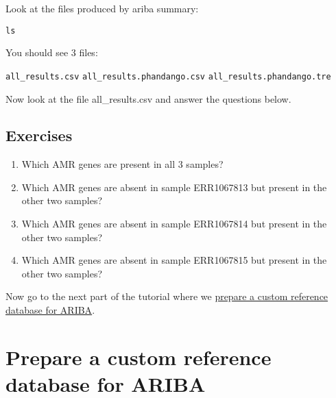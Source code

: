 \documentclass[11pt]{article}
\makeatletter
\providecommand{\tightlist}{%
      \setlength{\itemsep}{0pt}\setlength{\parskip}{0pt}}
\newcommand{\boxspacing}{\kern\kvtcb@left@rule\kern\kvtcb@boxsep}
\newcommand{\prompt}[4]{
        {\ttfamily\llap{{\color{blue}\LARGE\faKeyboardO\hspace{3pt}#4}}\vspace{-\baselineskip}}
    }
\makeatother
\begin{document}
    Look at the files produced by ariba summary:

    \begin{tcolorbox}[breakable, size=fbox, boxrule=1pt, pad at break*=1mm,colback=cellbackground, colframe=cellborder]
\prompt{In}{incolor}{ }{\boxspacing}
\begin{Verbatim}[commandchars=\\\{\}]
ls
\end{Verbatim}
\end{tcolorbox}

    You should see 3 files:

\texttt{all\_results.csv} \texttt{all\_results.phandango.csv}
\texttt{all\_results.phandango.tre}

Now look at the file all\_results.csv and answer the questions below.

    \hypertarget{exercises}{%
\subsection{Exercises}\label{exercises}}

\begin{enumerate}
\def\labelenumi{\arabic{enumi}.}
\tightlist
\item
  Which AMR genes are present in all 3 samples?
\item
  Which AMR genes are absent in sample ERR1067813 but present in the
  other two samples?
\item
  Which AMR genes are absent in sample ERR1067814 but present in the
  other two samples?
\item
  Which AMR genes are absent in sample ERR1067815 but present in the
  other two samples?
\end{enumerate}

    Now go to the next part of the tutorial where we
\href{make_custom_db.ipynb}{prepare a custom reference database for
ARIBA}.





\newpage





    \hypertarget{prepare-a-custom-reference-database-for-ariba}{%
\section{Prepare a custom reference database for
ARIBA}\label{prepare-a-custom-reference-database-for-ariba}}
\end{document}
